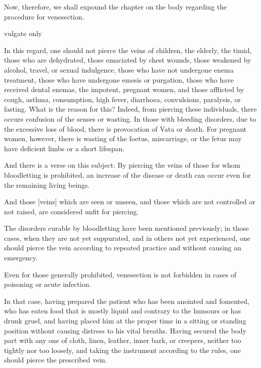 \begin{translation}
    \bigskip       

\begin{tt}
    \raggedright
    \bigskip

\item[1]
Now, therefore, we shall expound the chapter on the body regarding the procedure for venesection.

\item[2]   vulgate only

\item[3]
In this regard, one should not pierce the veins of children, the elderly, the timid, those who are dehydrated, those emaciated by chest wounds, those weakened by alcohol, travel, or sexual indulgence, those who have not undergone enema treatment, those who have undergone emesis or purgation, those who have received dental enemas, the impotent, pregnant women, and those afflicted by cough, asthma, consumption, high fever, diarrhoea, convulsions, paralysis, or fasting.
What is the reason for this? Indeed, from piercing these individuals, there occurs confusion of the senses or wasting.
In those with bleeding disorders, due to the excessive loss of blood, there is provocation of Vata or death.
For pregnant women, however, there is wasting of the foetus, miscarriage, or the fetus may have deficient limbs or a short lifespan.

\item[3a]
And there is a verse on this subject:
By piercing the veins of those for whom bloodletting is prohibited, an increase of the disease or death can occur even for the remaining living beings.

\item[3b]
And those [veins] which are seen or unseen, and those which are not controlled or not raised, are considered unfit for piercing.

\item[4]
The disorders curable by bloodletting have been mentioned previously; in those cases, when they are not yet suppurated, and in others not yet experienced, one should pierce the vein according to repeated practice and without causing an emergency.

\item[5]
Even for those generally prohibited, venesection is not forbidden in cases of poisoning or acute infection.

\item[6]
In that case, having prepared the patient who has been anointed and fomented, who has eaten food that is mostly liquid and contrary to the humours or has drunk gruel, and having placed him at the proper time in a sitting or standing position without causing distress to his vital breaths.
Having secured the body part with any one of cloth, linen, leather, inner bark, or creepers, neither too tightly nor too loosely, and taking the instrument according to the rules, one should pierce the prescribed vein.


\end{tt}
\end{translation}

